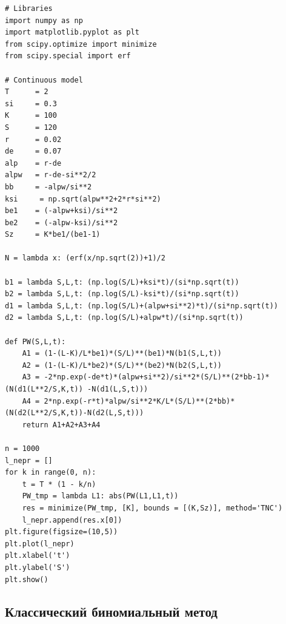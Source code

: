 \documentclass[oneside,final,12pt]{article}
\begin{document}
\begin{lstlisting}
# Libraries
import numpy as np
import matplotlib.pyplot as plt
from scipy.optimize import minimize
from scipy.special import erf

# Continuous model
T      = 2
si     = 0.3
K      = 100
S      = 120
r      = 0.02
de     = 0.07
alp    = r-de
alpw   = r-de-si**2/2
bb     = -alpw/si**2
ksi     = np.sqrt(alpw**2+2*r*si**2)
be1    = (-alpw+ksi)/si**2
be2    = (-alpw-ksi)/si**2
Sz     = K*be1/(be1-1)

N = lambda x: (erf(x/np.sqrt(2))+1)/2

b1 = lambda S,L,t: (np.log(S/L)+ksi*t)/(si*np.sqrt(t))
b2 = lambda S,L,t: (np.log(S/L)-ksi*t)/(si*np.sqrt(t))
d1 = lambda S,L,t: (np.log(S/L)+(alpw+si**2)*t)/(si*np.sqrt(t))
d2 = lambda S,L,t: (np.log(S/L)+alpw*t)/(si*np.sqrt(t))

def PW(S,L,t):
    A1 = (1-(L-K)/L*be1)*(S/L)**(be1)*N(b1(S,L,t))
    A2 = (1-(L-K)/L*be2)*(S/L)**(be2)*N(b2(S,L,t))
    A3 = -2*np.exp(-de*t)*(alpw+si**2)/si**2*(S/L)**(2*bb-1)*(N(d1(L**2/S,K,t)) -N(d1(L,S,t)))
    A4 = 2*np.exp(-r*t)*alpw/si**2*K/L*(S/L)**(2*bb)*(N(d2(L**2/S,K,t))-N(d2(L,S,t)))
    return A1+A2+A3+A4

n = 1000
l_nepr = []
for k in range(0, n):
    t = T * (1 - k/n)
    PW_tmp = lambda L1: abs(PW(L1,L1,t))
    res = minimize(PW_tmp, [K], bounds = [(K,Sz)], method='TNC')
    l_nepr.append(res.x[0])
plt.figure(figsize=(10,5))
plt.plot(l_nepr)
plt.xlabel('t')
plt.ylabel('S')
plt.show()
\end{lstlisting}

\newpage
{}
\subsection*{Классический биномиальный метод}
\end{document}

